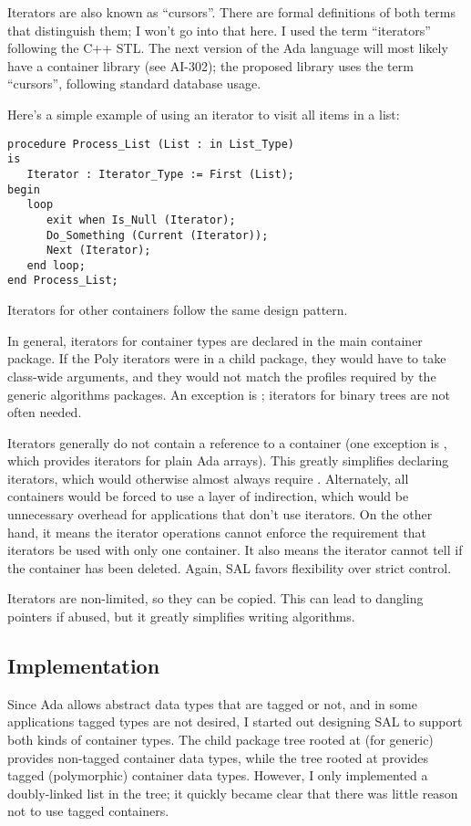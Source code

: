\documentclass{article}
\begin{document}
Iterators are also known as ``cursors''. There are formal definitions
of both terms that distinguish them; I won't go into that here. I used
the term ``iterators'' following the C++ STL. The next version of the
Ada language will most likely have a container library (see AI-302);
the proposed library uses the term ``cursors'', following standard
database usage.

Here's a simple example of using an iterator to visit all items in a
list:

\begin{verbatim}
procedure Process_List (List : in List_Type)
is
   Iterator : Iterator_Type := First (List);
begin
   loop
      exit when Is_Null (Iterator);
      Do_Something (Current (Iterator));
      Next (Iterator);
   end loop;
end Process_List;
\end{verbatim}

Iterators for other containers follow the same design pattern.

In general, iterators for container types are declared in the main
container package. If the Poly iterators were in a child package, they
would have to take class-wide arguments, and they would not match the
profiles required by the generic algorithms packages. An exception is
; iterators for binary trees are
not often needed.

Iterators generally do not contain a reference to a container (one
exception is , which provides iterators
for plain Ada arrays). This greatly simplifies declaring iterators,
which would otherwise almost always require .
Alternately, all containers would be forced to use a layer of
indirection, which would be unnecessary overhead for applications that
don't use iterators. On the other hand, it means the iterator
operations cannot enforce the requirement that iterators be used with
only one container. It also means the iterator cannot tell if the
container has been deleted. Again, SAL favors flexibility over strict
control.
      
Iterators are non-limited, so they can be copied. This can lead to
dangling pointers if abused, but it greatly simplifies writing
algorithms.

\subsection{Implementation}
Since Ada allows abstract data types that are tagged or not, and in
some applications tagged types are not desired, I started out
designing SAL to support both kinds of container types. The child
package tree rooted at  (for generic) provides
non-tagged container data types, while the tree rooted at
 provides tagged (polymorphic) container data types.
However, I only implemented a doubly-linked list in the 
tree; it quickly became clear that there was little reason not to use
tagged containers.
\end{document}
